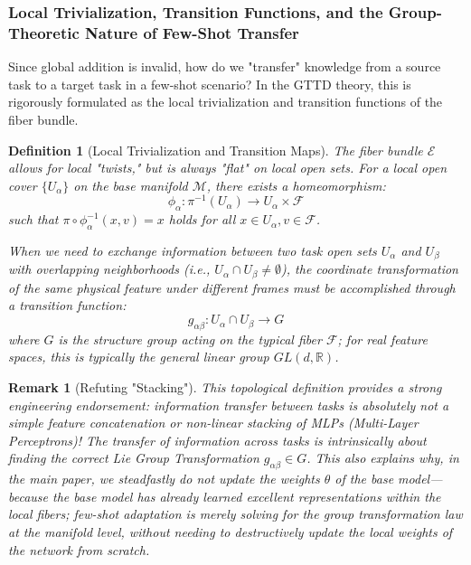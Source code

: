 \documentclass{article}
\newtheorem{definition}{Definition}[section]
\newtheorem{remark}{Remark}[section]
\begin{document}
\subsubsection{Local Trivialization, Transition Functions, and the Group-Theoretic Nature of Few-Shot Transfer}

Since global addition is invalid, how do we "transfer" knowledge from a source task to a target task in a few-shot scenario? In the GTTD theory, this is rigorously formulated as the local trivialization and transition functions of the fiber bundle.

\begin{definition}[Local Trivialization and Transition Maps]
The fiber bundle $\mathcal{E}$ allows for local "twists," but is always "flat" on local open sets. For a local open cover $\{U_\alpha\}$ on the base manifold $\mathcal{M}$, there exists a homeomorphism:
\begin{equation}
\phi_\alpha: \pi^{-1}(U_\alpha) \to U_\alpha \times \mathcal{F}
\end{equation}
such that $\pi \circ \phi_\alpha^{-1}(x, v) = x$ holds for all $x \in U_\alpha, v \in \mathcal{F}$.

When we need to exchange information between two task open sets $U_\alpha$ and $U_\beta$ with overlapping neighborhoods (i.e., $U_\alpha \cap U_\beta \neq \emptyset$), the coordinate transformation of the same physical feature under different frames must be accomplished through a transition function:
\begin{equation}
g_{\alpha\beta}: U_\alpha \cap U_\beta \to G
\end{equation}
where $G$ is the structure group acting on the typical fiber $\mathcal{F}$; for real feature spaces, this is typically the general linear group $GL(d, \mathbb{R})$.
\end{definition}

\begin{remark}[Refuting "Stacking"]
This topological definition provides a strong engineering endorsement: information transfer between tasks is absolutely not a simple feature concatenation or non-linear stacking of MLPs (Multi-Layer Perceptrons)! The transfer of information across tasks is intrinsically about finding the correct Lie Group Transformation $g_{\alpha\beta} \in G$. This also explains why, in the main paper, we steadfastly do not update the weights $\theta$ of the base model---because the base model has already learned excellent representations within the local fibers; few-shot adaptation is merely solving for the group transformation law at the manifold level, without needing to destructively update the local weights of the network from scratch.
\end{remark}
\end{document}
